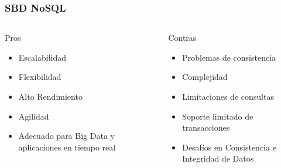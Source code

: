 \begin{frame}
    \frametitle{SBD NoSQL}

    \begin{columns}
        \begin{exampleblock}{Pros}
        \begin{itemize}
            \item Escalabilidad
            \item Flexibilidad
            \item Alto Rendimiento
            \item Agilidad
            \item Adecuado para Big Data y aplicaciones en tiempo real
        
        \end{itemize}
        \end{exampleblock}
        
        \begin{alertblock}{Contras}
        \begin{itemize}
            \item Problemas de consistencia
            \item Complejidad
            \item Limitaciones de consultas
            \item Soporte limitado de transacciones
            \item Desafíos en Consistencia e Integridad de Datos
        \end{itemize}
        \end{alertblock}
        
    \end{columns}
\end{frame}